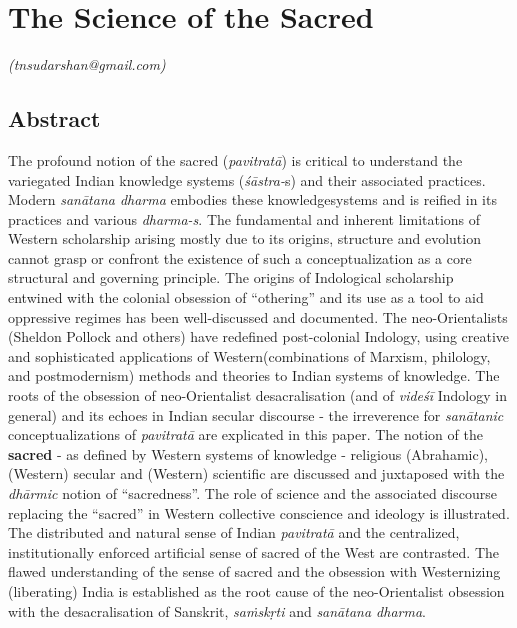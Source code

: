 
\chapter{The Science of the Sacred}\label{chapter9}


\begin{flushright}
\textit{\sf\em (tnsudarshan@gmail.com)}
\end{flushright}


\section*{Abstract}

The profound notion of the sacred (\textit{pavitratā}) is critical to understand the variegated Indian knowledge systems (\textit{śāstra-}s) and their associated practices. Modern \textit{sanātana dharma } embodies these knowledge\break systems and is reified in its practices and various \textit{dharma-s}. The fundamental and inherent limitations of Western scholarship arising mostly due to its origins, structure and evolution cannot grasp or confront the existence of such a conceptualization as a core structural and governing principle. The origins of Indological scholarship entwined with the colonial obsession of “othering” and its use as a tool to aid oppressive regimes has been well-discussed and documented. The neo-Orientalists (Sheldon Pollock and others) have redefined post-colonial Indology, using creative and sophisticated applications of Western\break (combinations of Marxism, philology, and postmodernism) methods and theories to Indian systems of knowledge. The roots of the obsession of neo-Orientalist desacralisation (and of \textit{videśī} Indology in general) and its echoes in Indian secular discourse - the irreverence for \textit{sanātanic} conceptualizations of \textit{pavitratā} are explicated in this paper. The notion of the \textbf{sacred} - as defined by Western systems of knowledge - religious (Abrahamic), (Western) secular and (Western) scientific are discussed and juxtaposed with the \textit{dhārmic} notion of “sacredness”. The role of science and the associated discourse replacing the “sacred” in Western collective conscience and ideology is illustrated. The distributed and natural sense of Indian \textit{pavitratā} and the centralized, institutionally enforced artificial sense of sacred of the West are contrasted. The flawed understanding of the sense of sacred and the obsession with Westernizing (liberating) India is established as the root cause of the neo-Orientalist obsession with the desacralisation of Sanskrit, \textit{saṁskṛti} and \textit{sanātana dharma}.


